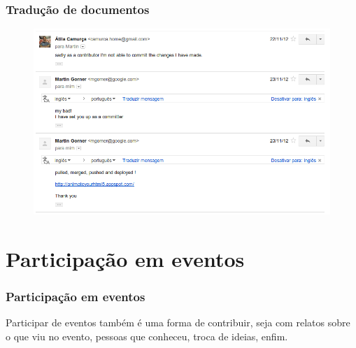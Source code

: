 \begin{frame}\frametitle{Tradução de documentos}

\begin{figure}
   \includegraphics[scale=0.4]{img/martin-gorner-2.png}
\end{figure}

\end{frame}

\begin{frame}\frametitle{}


\end{frame}

\section{Participação em eventos}

\begin{frame}\frametitle{Participação em eventos}

Participar de eventos também é uma forma de contribuir, seja com relatos
sobre o que viu no evento, pessoas que conheceu, troca de ideias, enfim.

\end{frame}

